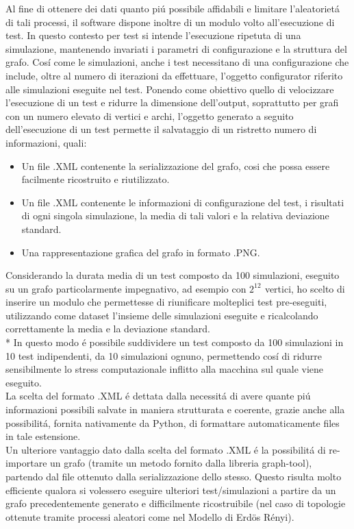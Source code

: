 \documentclass[../Tesi.tex]{subfiles}
\begin{document}
Al fine di ottenere dei dati quanto pi\'u possibile affidabili e limitare l'aleatoriet\'a di tali processi, il software dispone inoltre di un modulo volto all'esecuzione di test. In questo contesto per test si intende l'esecuzione ripetuta di una simulazione, mantenendo invariati i parametri di configurazione e la struttura del grafo. Cos\'i come le simulazioni, anche i test necessitano di una configurazione che include, oltre al numero di iterazioni da effettuare, l'oggetto configurator riferito alle simulazioni eseguite nel test.
Ponendo come obiettivo quello di velocizzare l'esecuzione di un test e ridurre la dimensione dell'output, soprattutto per grafi con un numero elevato di vertici e archi, l'oggetto generato a seguito dell'esecuzione di un test permette il salvataggio di un ristretto numero di informazioni, quali:
\begin{itemize}
\item Un file .XML contenente la serializzazione del grafo, cosi che possa essere facilmente ricostruito e riutilizzato.
\item Un file .XML contenente le informazioni di configurazione del test, i risultati di ogni singola simulazione, la media di tali valori e la relativa deviazione standard.
\item Una rappresentazione grafica del grafo in formato .PNG.
\end{itemize}
Considerando la durata media di un test composto da 100 simulazioni, eseguito su un grafo particolarmente impegnativo, ad esempio con $2^{12^{\mathrm{}}}$ vertici, ho scelto di inserire un modulo che permettesse di riunificare molteplici test pre-eseguiti, utilizzando come dataset l'insieme delle simulazioni eseguite e ricalcolando correttamente la media e la deviazione standard.\\*
In questo modo \'e possibile suddividere un test composto da 100 simulazioni in 10 test indipendenti, da 10 simulazioni ognuno, permettendo cos\'i di ridurre sensibilmente lo stress computazionale inflitto alla macchina sul quale viene eseguito.\\
La scelta del formato .XML \'e dettata dalla necessit\'a di avere quante pi\'u informazioni possibili salvate in maniera strutturata e coerente, grazie anche alla possibilit\'a, fornita nativamente da Python, di formattare automaticamente files in tale estensione.\\
Un ulteriore vantaggio dato dalla scelta del formato .XML \'e la possibilit\'a di re-importare un grafo (tramite un metodo fornito dalla libreria graph-tool), partendo dal file ottenuto dalla serializzazione dello stesso. Questo risulta molto efficiente qualora si volessero eseguire ulteriori test/simulazioni a partire da un grafo precedentemente generato e difficilmente ricostruibile (nel caso di topologie ottenute tramite processi aleatori come nel Modello di Erd{\"o}s R\'enyi).
\end{document}
